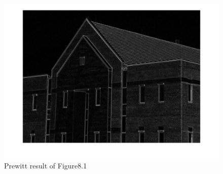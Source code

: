 \documentclass[11pt,oneside]{book}
\begin{document}
\begin{figure}[!htb]
   \centering  
   \includegraphics[width=1\textwidth]{images/9/prewitt.jpg}
   \caption{Prewitt result of Figure8.1}
\end{figure}
\end{document}

